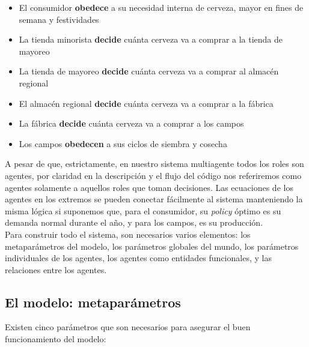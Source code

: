 \begin{itemize}
    \item El consumidor \textbf{obedece} a su necesidad interna de cerveza, mayor en fines de semana y festividades
    \item La tienda minorista \textbf{decide} cu\'anta cerveza va a comprar a la tienda de mayoreo
    \item La tienda de mayoreo \textbf{decide} cu\'anta cerveza va a comprar al almac\'en regional
    \item El almac\'en regional \textbf{decide} cu\'anta cerveza va a comprar a la f\'abrica
    \item La f\'abrica \textbf{decide} cu\'anta cerveza va a comprar a los campos
    \item Los campos \textbf{obedecen} a sus ciclos de siembra y cosecha
\end{itemize}

A pesar de que, estrictamente, en nuestro sistema multiagente todos los roles son agentes, por claridad en la descripci\'on y el flujo del c\'odigo nos referiremos como agentes solamente a aquellos roles que toman decisiones. Las ecuaciones de los agentes en los extremos se pueden conectar f\'acilmente al sistema manteniendo la misma l\'ogica si suponemos que, para el consumidor, su \textit{policy} \'optimo es su demanda normal durante el a\~no, y para los campos, es su producci\'on.\\

Para construir todo el sistema, son necesarios varios elementos: los metapar\'ametros del modelo, los par\'ametros globales del mundo, los par\'ametros individuales de los agentes, los agentes como entidades funcionales, y las relaciones entre los agentes.\\

\subsection{El modelo: metapar\'ametros}

Existen cinco par\'ametros que son necesarios para asegurar el buen funcionamiento del modelo:

